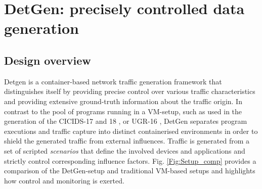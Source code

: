 \documentclass[runningheads]{llncs}
\begin{document}
\section{DetGen: precisely controlled data generation}\label{Sec:Archi}





\subsection{Design overview}

Detgen is a container-based network traffic generation framework that distinguishes itself by providing precise control over various traffic characteristics and providing extensive ground-truth information about the traffic origin. %
In contrast to the pool of programs running in a VM-setup, such as used in the generation of the CICIDS-17 and 18 \cite{sharafaldin2018toward}, or UGR-16 \cite{macia2018ugr}, DetGen separates program executions and traffic capture into distinct containerised environments in order to shield the generated traffic from external influences.%
Traffic is generated from a set of scripted \textit{scenarios} that define the involved devices and applications and strictly control corresponding influence factors. 
Fig. \ref{Fig:Setup_comp} provides a comparison of the DetGen-setup and traditional VM-based setups and highlights how control and monitoring is exerted.
\end{document}
